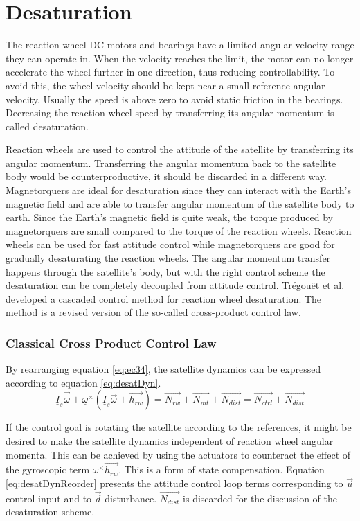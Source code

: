 \section{Desaturation}

The reaction wheel DC motors and bearings have a limited angular velocity range they can operate in. When the velocity reaches the limit, the motor can no longer accelerate the wheel further in one direction, thus reducing controllability. To avoid this, the wheel velocity should be kept near a small reference angular velocity. Usually the speed is above zero to avoid static friction in the bearings. Decreasing the reaction wheel speed by transferring its angular momentum is called desaturation.

Reaction wheels are used to control the attitude of the satellite by transferring its angular momentum. Transferring the angular momentum back to the satellite body would be counterproductive, it should be discarded in a different way. Magnetorquers are ideal for desaturation since they can interact with the Earth's magnetic field and are able to transfer angular momentum of the satellite body to earth. Since the Earth's magnetic field is quite weak, the torque produced by magnetorquers are small compared to the torque of the reaction wheels. Reaction wheels can be used for fast attitude control while magnetorquers are good for gradually desaturating the reaction wheels. The angular momentum transfer happens through the satellite's body, but with the right control scheme the desaturation can be  completely decoupled from attitude control. Trégouët et al. \cite{DesatTregouet} developed a cascaded control method for reaction wheel desaturation. The method is a revised version of the so-called cross-product control law. 

\subsubsection{Classical Cross Product Control Law}

By rearranging equation \ref{eq:ec34}, the satellite dynamics can be expressed according to equation \ref{eq:desatDyn}.
\begin{equation}
\underline I_{s} \vec{\dot{\omega}} + \underline{\omega}^\times(\underline I_{s} \vec{\omega} + \vec{h_{rw}}) = \vec{N_{rw}} +  \vec{N_{mt}} + \vec{N_{dist}} = \vec{N_{ctrl}} + \vec{N_{dist}}
\label{eq:desatDyn}
\end{equation}

If the control goal is rotating the satellite according to the references, it might be desired to make the satellite dynamics independent of reaction wheel angular momenta. This can be achieved by using the actuators to counteract the effect of the gyroscopic term $\underline{\omega}^\times \vec{h_{rw}}$. This is a form of state compensation. Equation \ref{eq:desatDynReorder} presents the attitude control loop terms corresponding to $\vec{u}$ control input and to $\vec{d}$ disturbance. $\vec{N_{dist}}$ is discarded for the discussion of the desaturation scheme.


